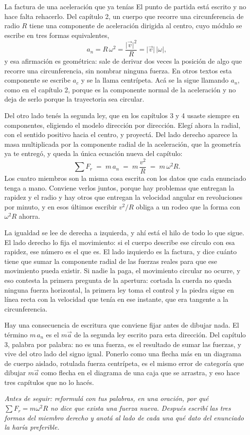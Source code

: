 \documentclass[11pt,openany]{book}
\begin{document}
\begin{bloque}{La factura de una aceleración que ya tenías}
El punto de partida está escrito y no hace falta rehacerlo. Del capítulo 2, un cuerpo que recorre una circunferencia de radio $R$ tiene una componente de aceleración dirigida al centro, cuyo módulo se escribe en tres formas equivalentes,
\[
a_n = R\,\omega^2 = \frac{\lvert\vec v\rvert^2}{R} = \lvert\vec v\rvert\,\lvert\omega\rvert ,
\]
y esa afirmación es geométrica: sale de derivar dos veces la posición de algo que recorre una circunferencia, sin nombrar ninguna fuerza. En otros textos esta componente se escribe $a_c$ y se la llama centrípeta. Acá se la sigue llamando $a_n$, como en el capítulo 2, porque es la componente normal de la aceleración y no deja de serlo porque la trayectoria sea circular.

Del otro lado tenés la segunda ley, que en los capítulos 3 y 4 usaste siempre en componentes, eligiendo el modelo dirección por dirección. Elegí ahora la radial, con el sentido positivo hacia el centro, y proyectá. Del lado derecho aparece la masa multiplicada por la componente radial de la aceleración, que la geometría ya te entregó, y queda la única ecuación nueva del capítulo:
\[
\sum F_r \;=\; m\,a_n \;=\; m\,\frac{v^2}{R} \;=\; m\,\omega^2 R .
\]
Los cuatro miembros son la misma cosa escrita con los datos que cada enunciado tenga a mano. Conviene verlos juntos, porque hay problemas que entregan la rapidez y el radio y hay otros que entregan la velocidad angular en revoluciones por minuto, y en esos últimos escribir $v^2/R$ obliga a un rodeo que la forma con $\omega^2 R$ ahorra.

La igualdad se lee de derecha a izquierda, y ahí está el hilo de todo lo que sigue. El lado derecho lo fija el movimiento: si el cuerpo describe ese círculo con esa rapidez, ese número es el que es. El lado izquierdo es la factura, y dice cuánto tiene que sumar la componente radial de las fuerzas reales para que ese movimiento pueda existir. Si nadie la paga, el movimiento circular no ocurre, y eso contesta la primera pregunta de la apertura: cortada la cuerda no queda ninguna fuerza horizontal, la primera ley toma el control y la piedra sigue en línea recta con la velocidad que tenía en ese instante, que era tangente a la circunferencia.

Hay una consecuencia de escritura que conviene fijar antes de dibujar nada. El término $m\,a_n$ es el $m\vec a$ de la segunda ley escrito para esta dirección. Del capítulo 3, palabra por palabra: no es una fuerza, es el resultado de sumar las fuerzas, y vive del otro lado del signo igual. Ponerlo como una flecha más en un diagrama de cuerpo aislado, rotulada fuerza centrípeta, es el mismo error de categoría que dibujar $m\vec a$ como flecha en el diagrama de una caja que se arrastra, y eso hace tres capítulos que no lo hacés.

\textit{Antes de seguir: reformulá con tus palabras, en una oración, por qué $\sum F_r = m\omega^2 R$ no dice que exista una fuerza nueva. Después escribí las tres formas del miembro derecho y anotá al lado de cada una qué dato del enunciado la haría preferible.}
\end{bloque}
\end{document}

